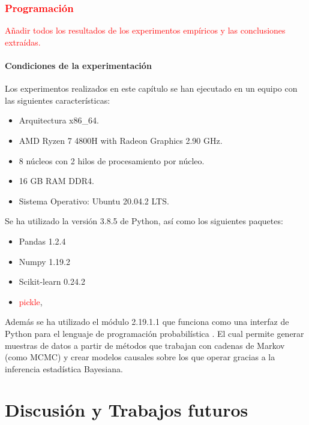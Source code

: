 \documentclass[oneside,openright,titlepage,numbers=noenddot,openany,headinclude,footinclude=true,
cleardoublepage=empty,abstractoff,BCOR=5mm,paper=a4,fontsize=12pt,main=spanish]{scrreprt}
\begin{document}
\section{\textcolor{red}{Programación}}

\textcolor{red}{Añadir todos los resultados de los experimentos empíricos y las conclusiones extraídas.}

\subsection{Condiciones de la experimentación}

Los experimentos realizados en este capítulo se han ejecutado en un equipo con las siguientes características:

\begin{itemize}
    \item Arquitectura x86\_64.
    \item AMD Ryzen 7 4800H with Radeon Graphics 2.90 GHz.
    \item 8 núcleos con 2 hilos de procesamiento por núcleo.
    \item 16 GB RAM DDR4.
    \item Sistema Operativo: Ubuntu 20.04.2 LTS.
\end{itemize}

Se ha utilizado la versión 3.8.5 de Python, así como los siguientes paquetes: 

\begin{itemize}
    \item Pandas 1.2.4
    \item Numpy 1.19.2
    \item Scikit-learn 0.24.2
    \item \textcolor{red}{pickle}, %
\end{itemize}

Además se ha utilizado el módulo \cite{pystan} 2.19.1.1 que funciona como una interfaz de Python para el lenguaje de programación probabilística \cite{stan}. El cual permite generar muestras de datos a partir de métodos que trabajan con cadenas de Markov (como MCMC) y crear modelos causales sobre los que operar gracias a la inferencia estadística Bayesiana.


\part{Discusión y Trabajos futuros} \label{part:debate_fut}
\end{document}
